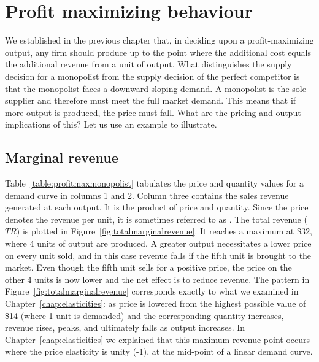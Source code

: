 \section{Profit maximizing behaviour}\label{sec:ch10sec2}

We established in the previous chapter that, in deciding upon a profit-maximizing output, any firm should produce up to the point where the additional cost equals the additional revenue from a unit of output. What distinguishes the supply decision for a monopolist from the supply decision of the perfect competitor is that the monopolist faces a downward sloping demand. A monopolist is the sole supplier and therefore must meet the full market demand. This means that if more output is produced, the price must fall. What are the pricing and output implications of this? Let us use an example to illustrate.

\subsection*{Marginal revenue}

Table~\ref{table:profitmaxmonopolist} tabulates the price and quantity values for a demand curve in columns 1 and 2. Column three contains the sales revenue generated at each output. It is the product of price and quantity. Since the price denotes the revenue per unit, it is sometimes referred to as . The total revenue ($TR$) is plotted in Figure~\ref{fig:totalmarginalrevenue}. It reaches a maximum at \$32, where 4 units of output are produced. A greater output necessitates a lower price on every unit sold, and in this case revenue falls if the fifth unit is brought to the market. Even though the fifth unit sells for a positive price, the price on the other 4 units is now lower and the net effect is to reduce revenue. The pattern in Figure~\ref{fig:totalmarginalrevenue} corresponds exactly to what we examined in Chapter~\ref{chap:elasticities}: as price is lowered from the highest possible value of \$14 (where 1 unit is demanded) and the corresponding quantity increases, revenue rises, peaks, and ultimately falls as output increases. In Chapter~\ref{chap:elasticities} we explained that this maximum revenue point occurs where the price elasticity is unity (-1), at the mid-point of a linear demand curve. 

